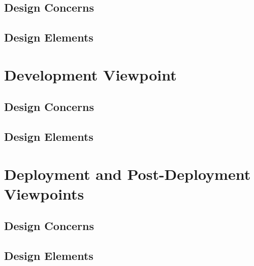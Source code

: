 \documentclass[onecolumn, draftclsnofoot,10pt, compsoc]{IEEEtran}
\begin{document}
\subsection{Design Concerns}
\subsection{Design Elements}

\section{Development Viewpoint}
\subsection{Design Concerns}
\subsection{Design Elements}

\section{Deployment and Post-Deployment Viewpoints}
\subsection{Design Concerns}
\subsection{Design Elements}
\end{document}
